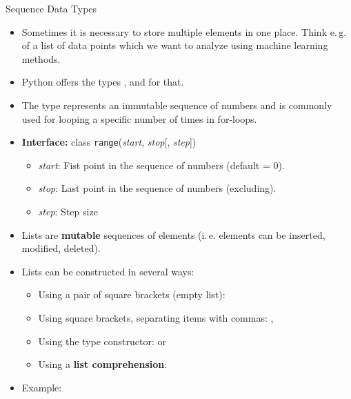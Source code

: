\begin{dwHeaderFrame}{Sequence Data Types}
	\begin{itemize}
		\item Sometimes it is necessary to store multiple elements in one place.
			Think e.\,g. of a list of data points which we want to analyze using machine learning methods.
		\item Python offers the types ,  and  for that. 
	\end{itemize}
	
	\begin{itemize}
		\item The  type represents an immutable sequence of numbers and is commonly used for looping a specific number of times in for-loops.
		\item \textbf{Interface:} class \texttt{range}(\textit{start}, \textit{stop}[, \textit{step}])
		\begin{itemize}
			\item \textit{start}: Fist point in the sequence of numbers (default = 0).
			\item \textit{stop}: Last point in the sequence of numbers (excluding).
			\item \textit{step}: Step size
		\end{itemize}
	\end{itemize}
\end{dwHeaderFrame}
	
	
\begin{frame}
	\begin{itemize}
		\item Lists are \textbf{mutable} sequences of elements (i.\,e. elements can be inserted, modified, deleted).
		\item Lists can be constructed in several ways:
		\begin{itemize}
			\item Using a pair of square brackets (empty list): \code{[]}
			\item Using square brackets, separating items with commas: \code{[a]}, \code{[a, b, c]}
			\item Using the type constructor:  or 
			\item Using a \textbf{list comprehension}: 
		\end{itemize}
		\item Example: 
	\end{itemize}
	
\end{frame}


